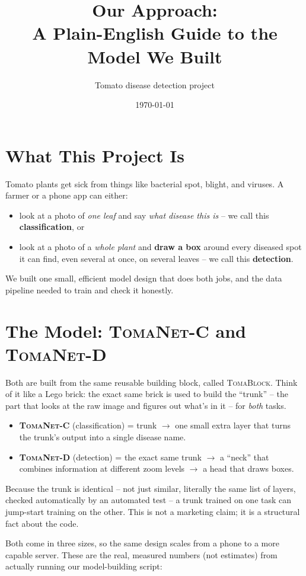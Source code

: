 \documentclass[11pt,a4paper]{article}
\title{\textbf{Our Approach: \model{}}\\[4pt]
\large A Plain-English Guide to the Model We Built}
\author{Tomato disease detection project}
\date{\today}
\newcommand{\modelcls}{\textsc{TomaNet-C}}
\newcommand{\modeldet}{\textsc{TomaNet-D}}
\begin{document}
\maketitle
\tableofcontents
\newpage

\section{What This Project Is}
Tomato plants get sick from things like bacterial spot, blight, and viruses. A farmer or
a phone app can either:
\begin{itemize}
  \item look at a photo of \emph{one leaf} and say \emph{what disease this is} -- we call
    this \textbf{classification}, or
  \item look at a photo of a \emph{whole plant} and \textbf{draw a box} around every
    diseased spot it can find, even several at once, on several leaves -- we call this
    \textbf{detection}.
\end{itemize}
We built one small, efficient model design that does both jobs, and the data pipeline
needed to train and check it honestly.

\section{The Model: \modelcls{} and \modeldet{}}
Both are built from the same reusable building block, called \textsc{TomaBlock}. Think of
it like a Lego brick: the exact same brick is used to build the ``trunk'' -- the part
that looks at the raw image and figures out what's in it -- for \emph{both} tasks.

\begin{itemize}
  \item \textbf{\modelcls{}} (classification) = trunk $\to$ one small extra layer that
    turns the trunk's output into a single disease name.
  \item \textbf{\modeldet{}} (detection) = the exact same trunk $\to$ a ``neck'' that
    combines information at different zoom levels $\to$ a head that draws boxes.
\end{itemize}

Because the trunk is identical -- not just similar, literally the same list of layers,
checked automatically by an automated test -- a trunk trained on one task can jump-start
training on the other. This is not a marketing claim; it is a structural fact about the
code.

Both come in three sizes, so the same design scales from a phone to a more capable
server. These are the real, measured numbers (not estimates) from actually running our
model-building script:
\end{document}

